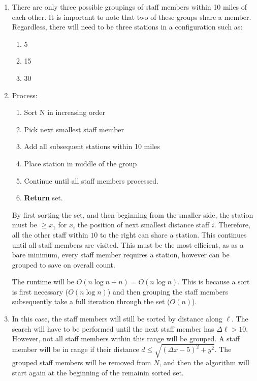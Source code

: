 \documentclass{article}
\begin{document}
\begin{enumerate}[label=\alph*)]
    \item There are only three possible groupings of staff members within 10 miles of each other.
        It is important to note that two of these groups share a member.
        Regardless, there will need to be three stations in a configuration such as:
        \begin{enumerate}[label={Station \arabic*:}, leftmargin=*]
            \item 5
            \item 15
            \item 30
        \end{enumerate}
    \item Process:
        \begin{enumerate}[label=\arabic*:]
            \item Sort N in increasing order
            \item Pick next smallest staff member
            \item Add all subsequent stations within 10 miles
            \item Place station in middle of the group
            \item Continue until all staff members processed.
            \item \textbf{Return} set.
        \end{enumerate}
        
        By first sorting the set, and then beginning from the smaller side,
        the station must be $\geq x_1$ for $x_i$ the position of next smallest
        distance staff $i$. Therefore, all the other staff within $10$ to the right
        can share a station. This continues until all staff members are visited.
        This must be the most efficient, as as a bare minimum, every staff member
        requires a station, however can be grouped to save on overall count.

        The runtime will be $O(n \log{n} + n) = O(n \log{n})$.
        This is because a sort is first necessary ($O(n \log{n})$)
        and then grouping the staff members subsequently
        take a full iteration through the set ($O(n)$).

    \item In this case, the staff members will still be sorted by distance along $\ell$.
        The search will have to be performed until the next staff member
        has $\Delta \ell > 10$. However, not all staff members within this range will be
        grouped. A staff member will be in range if their
        distance $d \leq \sqrt{(\Delta x-5)^2 + y^2}$.
        The grouped staff members will be removed from $N$, and then the algorithm
        will start again at the beginning of the remainin sorted set.
        

\end{enumerate}
\end{document}
